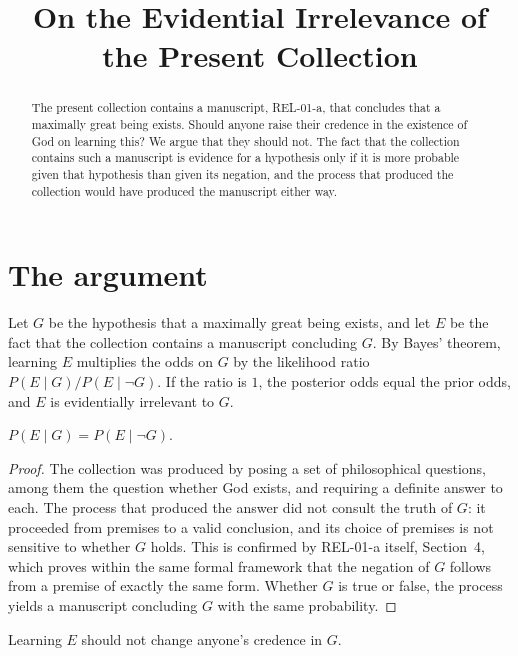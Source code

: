 \documentclass{situationist-preprint}
\title{On the Evidential Irrelevance of the Present Collection}
\begin{document}
\maketitle

\begin{abstract}
The present collection contains a manuscript, REL-01-a, that concludes that a maximally great being exists. Should anyone raise their credence in the existence of God on learning this? We argue that they should not. The fact that the collection contains such a manuscript is evidence for a hypothesis only if it is more probable given that hypothesis than given its negation, and the process that produced the collection would have produced the manuscript either way.
\end{abstract}

\section{The argument}

Let $G$ be the hypothesis that a maximally great being exists, and let $E$ be the fact that the collection contains a manuscript concluding $G$. By Bayes' theorem, learning $E$ multiplies the odds on $G$ by the likelihood ratio $P(E \mid G) / P(E \mid \neg G)$. If the ratio is $1$, the posterior odds equal the prior odds, and $E$ is evidentially irrelevant to $G$.

\begin{proposition}\label{p:main}
$P(E \mid G) = P(E \mid \neg G)$.
\end{proposition}

\begin{proof}
The collection was produced by posing a set of philosophical questions, among them the question whether God exists, and requiring a definite answer to each. The process that produced the answer did not consult the truth of $G$: it proceeded from premises to a valid conclusion, and its choice of premises is not sensitive to whether $G$ holds. This is confirmed by REL-01-a itself, Section~4, which proves within the same formal framework that the negation of $G$ follows from a premise of exactly the same form. Whether $G$ is true or false, the process yields a manuscript concluding $G$ with the same probability.
\end{proof}

\begin{theorem}\label{t:main}
Learning $E$ should not change anyone's credence in $G$.
\end{theorem}
\end{document}
